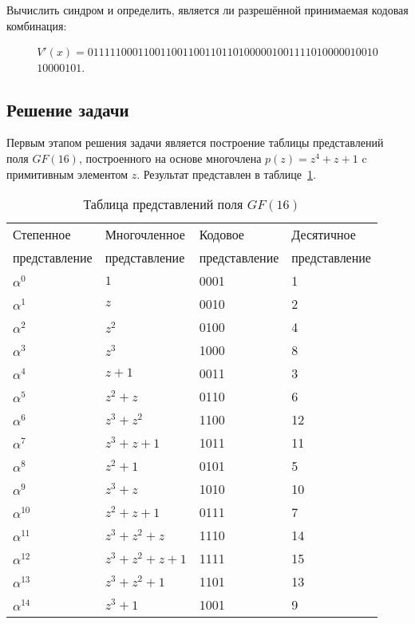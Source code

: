 Вычислить синдром и определить, является ли разрешённой принимаемая
кодовая комбинация:

\begin{gather*}
  V'(x) = 0111110001100110011001101101000001001111010000010010\\10000101.
\end{gather*}

\subsection{Решение задачи}

Первым этапом решения задачи является построение таблицы представлений
поля $GF(16)$, построенного на основе многочлена $p(z)=z^4+z+1$ c
примитивным элементом $z$. Результат представлен в
таблице~\ref{tab:predst_gf16}.

\begin{table}[h!]
  \caption{Таблица представлений поля $GF(16)$}
  \label{tab:predst_gf16}
  \begin{tabular}{|l|l|l|l|}
    \hline
    Степенное & Многочленное & Кодовое & Десятичное \\
    представление & представление & представление & представление \\\hline
    $\alpha^0   $ & $1          $ & 0001 & 1 \\\hline
    $\alpha^1   $ & $z          $ & 0010 & 2 \\\hline
    $\alpha^2   $ & $z^2        $ & 0100 & 4 \\\hline
    $\alpha^3   $ & $z^3        $ & 1000 & 8 \\\hline
    $\alpha^4   $ & $z+1        $ & 0011 & 3 \\\hline
    $\alpha^5   $ & $z^2+z      $ & 0110 & 6 \\\hline
    $\alpha^6   $ & $z^3+z^2    $ & 1100 & 12 \\\hline
    $\alpha^7   $ & $z^3+z+1    $ & 1011 & 11 \\\hline
    $\alpha^8   $ & $z^2+1      $ & 0101 & 5 \\\hline
    $\alpha^9   $ & $z^3+z      $ & 1010 & 10 \\\hline
    $\alpha^{10}$ & $z^2+z+1    $ & 0111 & 7 \\\hline
    $\alpha^{11}$ & $z^3+z^2+z  $ & 1110 & 14 \\\hline
    $\alpha^{12}$ & $z^3+z^2+z+1$ & 1111 & 15 \\\hline
    $\alpha^{13}$ & $z^3+z^2+1  $ & 1101 & 13 \\\hline
    $\alpha^{14}$ & $z^3+1      $ & 1001 & 9 \\\hline
  \end{tabular}
\end{table}

